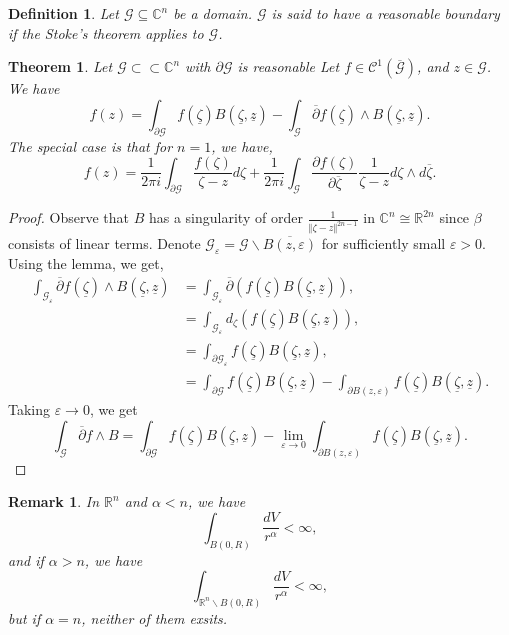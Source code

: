 \documentclass{article}
\newtheorem{theorem}{Theorem} [section]
\newtheorem{definition}{Definition}[section]
\newtheorem{remark}{Remark}[section]
\newcommand{\norm}[1]{\Vert #1 \Vert}
\newcommand{\R}[0]{\mathbb{R}}
\newcommand{\C}[0]{\mathbb{C}}
\newcommand{\G}[0]{\mathcal{G}}
\newcommand{\pd}[2]{{\frac {\partial#1} {\partial#2}}}
\newcommand{\bd}[0]{\partial}
\newcommand{\mzeta}[0]{\underline{\zeta}}
\newcommand{\mz}[0]{\underline{z}}
\begin{document}
\begin{definition}
  Let $\G\subseteq\C^n$ be a domain. $\G$ is said to have a reasonable boundary if the Stoke's theorem applies to $\G$.
\end{definition}

\begin{theorem}
  Let $\mathcal{G}\subset\subset \C^n$ with $\partial \mathcal{G}$ is reasonable Let $f\in\mathcal{C}^1(\overline{\mathcal{G}})$, and $z\in\G$. We have 
  \begin{equation*}
    f(z) = \int_{\partial \G}f(\underline{\zeta})B(\underline{\zeta},\underline{z}) - \int_\G \overline{\partial}f(\underline{\zeta})\wedge B(\underline{\zeta},\underline{z}).
  \end{equation*}
  The special case is that for $n= 1$, we have, 
  \begin{equation*}
    f(z) = {\frac 1 {2\pi i}}\int_{\partial \G} {\frac {f(\zeta)} {\zeta-z}}d\zeta + {\frac 1 {2\pi i}}\int_\G \pd{f(\zeta)}{\overline{\zeta}}{\frac 1 {\zeta-z}}d\zeta\wedge d\overline{\zeta}.
  \end{equation*}
\end{theorem}
\begin{proof}
  Observe that $B$ has a singularity of order ${\frac 1 {\norm{\zeta-z}^{2n-1}}}$ in $\C^n\cong\R^{2n}$ since $\beta$ consists of linear terms.
  Denote $\G_\varepsilon = \G\backslash\overline{B(z,\varepsilon)}$ for sufficiently small $\varepsilon>0$. Using the lemma, we get, %
  \begin{align*}
    \int_{\G_\varepsilon} \overline{\bd}f(\mzeta)\wedge B(\mzeta,\mz) &= \int_{\G_\varepsilon}\overline{\bd}(f(\mzeta)B(\mzeta,\mz)),\\
    & = \int_{\G_\varepsilon}d_\zeta(f(\mzeta)B(\mzeta,\mz)),\\
    & = \int_{\bd\G_\varepsilon}f(\mzeta)B(\mzeta,\mz),\\
    & = \int_{\bd\G}f(\mzeta)B(\mzeta,\mz)-\int_{\bd B(z,\varepsilon)}f(\mzeta)B(\mzeta,\mz).
  \end{align*}
  Taking $\varepsilon\to0$, we get 
  \begin{equation*}
    \int_\G\overline{\bd}f\wedge B = \int_{\bd\G}f(\mzeta)B(\mzeta,\mz)-\lim_{\varepsilon\to 0 }\int_{\bd B(z,\varepsilon)}f(\mzeta)B(\mzeta,\mz).
  \end{equation*}

\end{proof}

\begin{remark}
  In $\R^n$ and $\alpha<n$, we have 
  \begin{equation*}
    \int_{B(0,R)}{\frac {dV} {r^\alpha}}<\infty,
  \end{equation*}
  and if $\alpha>n$, we have 
  \begin{equation*}
    \int_{\R^n\backslash B(0,R)}{\frac {dV} {r^\alpha}}<\infty,
  \end{equation*}
  but if $\alpha=n$, neither of them exsits.
\end{remark}
\end{document}
